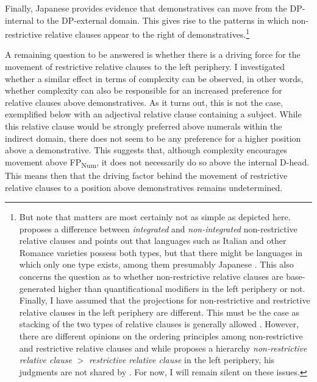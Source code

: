 \documentclass [output=book,colorlinks,citecolor=brown]{langscibook}
\begin{document}
Finally, Japanese provides evidence that demonstratives can move from the DP-internal to the DP-external domain. This gives rise to the patterns in which non-restrictive relative clauses appear to the right of demonstratives.\footnote{But note that matters are most certainly not as simple as depicted here. \citet{cinque:2008:two} proposes a difference between \textit{integrated} and \textit{non-integrated} non-restrictive relative clauses and points out that languages such as Italian and other Romance varieties possess both types, but that there might be languages in which only one type exists, among them presumably Japanese \citep[121–124]{cinque:2008:two}. This also concerns the question as to whether non-restrictive relative clauses are base-generated higher than quantificational modifiers in the left periphery or not. Finally, I have assumed that the projections for non-restrictive and restrictive relative clauses in the left periphery are different. This must be the case as stacking of the two types of relative clauses is generally allowed \citep{cinque:2008:two, ishizuka:2008:RC}. However, there are different opinions on the ordering principles among non-restrictive and restrictive relative clauses and while \citealt{cinque:2008:two} proposes a hierarchy \textit{non-restrictive relative clause} $>$ \textit{restrictive relative clause} in the left periphery, his judgments are not shared by \citet{ishizuka:2008:RC}. For now, I will remain silent on these issues.}

A remaining question to be answered is whether there is a driving force for the movement of restrictive relative clauses to the left periphery. I investigated whether a similar effect in terms of complexity can be observed, in other words, whether complexity can also be responsible for an increased preference for relative clauses above demonstratives. As it turns out, this is not the case, exemplified below with an adjectival relative clause containing a subject. While this relative clause would be strongly preferred above numerals within the indirect domain, there does not seem to be any preference for a higher position above a demonstrative. This suggests that, although complexity encourages movement above FP\textsubscript{Num}, it does not necessarily do so above the internal D-head. This means then that the driving factor behind the movement of restrictive relative clauses to a position above demonstratives remains undetermined.
\end{document}
